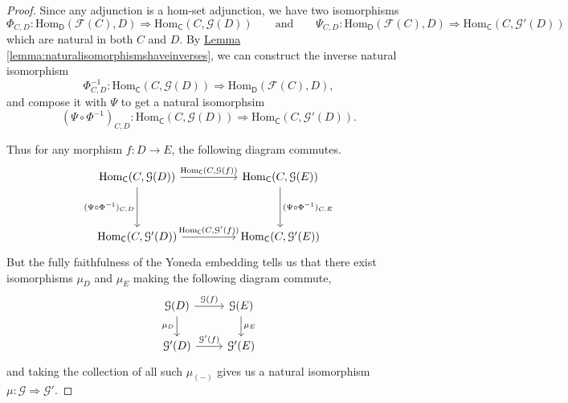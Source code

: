 \documentclass[a4paper,10pt]{scrreprt}
\newcommand{\Hom}{\mathrm{Hom}}
\theoremstyle{definition}
\theoremstyle{plain}
\theoremstyle{remark}
\begin{document}
\begin{proof}
  Since any adjunction is a hom-set adjunction, we have two isomorphisms
  \begin{equation*}
    \Phi_{C, D}\colon \Hom_{\mathsf{D}}(\mathcal{F}(C), D) \Rightarrow \Hom_{\mathsf{C}}(C, \mathcal{G}(D))\qquad\text{and}\qquad \Psi_{C, D}\colon \Hom_{\mathsf{D}}(\mathcal{F}(C), D) \Rightarrow \Hom_{\mathsf{C}}(C, \mathcal{G}'(D))
  \end{equation*}
  which are natural in both $C$ and $D$. By \hyperref[lemma:naturalisomorphismshaveinverses]{Lemma \ref*{lemma:naturalisomorphismshaveinverses}}, we can construct the inverse natural isomorphism
  \begin{equation*}
    \Phi^{-1}_{C, D}\colon \Hom_{\mathsf{C}}(C, \mathcal{G}(D)) \Rightarrow \Hom_{\mathsf{D}}(\mathcal{F}(C), D),
  \end{equation*}
  and compose it with $\Psi$ to get a natural isomorphsim
  \begin{equation*}
    (\Psi \circ \Phi^{-1})_{C, D}\colon \Hom_{\mathsf{C}}(C, \mathcal{G}(D)) \Rightarrow \Hom_{\mathsf{C}}(C, \mathcal{G}'(D)).
  \end{equation*}

  Thus for any morphism $f\colon D \to E$, the following diagram commutes.
  \begin{equation*}
    \begin{tikzcd}[row sep=huge, column sep=huge]
      \Hom_{\mathsf{C}}(C, \mathcal{G}(D))
      \arrow[r, "{\Hom_{\mathsf{C}}(C, \mathcal{G}(f))}"]
      \arrow[d, swap, "{(\Psi \circ \Phi^{-1})_{C, D}}"]
      & \Hom_{\mathsf{C}}(C, \mathcal{G}(E))
      \arrow[d, "{(\Psi \circ \Phi^{-1})_{C, E}}"]
      \\
      \Hom_{\mathsf{C}}(C, \mathcal{G}'(D))
      \arrow[r, "{\Hom_{\mathsf{C}}(C, \mathcal{G}'(f))}"]
      & \Hom_{\mathsf{C}}(C, \mathcal{G}'(E))
    \end{tikzcd}
  \end{equation*}
  But the fully faithfulness of the Yoneda embedding tells us that there exist isomorphisms $\mu_{D}$ and $\mu_{E}$ making the following diagram commute,
  \begin{equation*}
    \begin{tikzcd}
      \mathcal{G}(D)
      \arrow[r, "\mathcal{G}(f)"]
      \arrow[d, swap, "\mu_{D}"]
      & \mathcal{G}(E)
      \arrow[d, "\mu_{E}"]
      \\
      \mathcal{G}'(D)
      \arrow[r, "\mathcal{G}'(f)"]
      & \mathcal{G}'(E)
    \end{tikzcd}
  \end{equation*}
  and taking the collection of all such $\mu_{(-)}$ gives us a natural isomorphism $\mu\colon \mathcal{G} \Rightarrow \mathcal{G}'$.
\end{proof}
\end{document}

